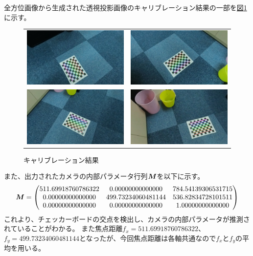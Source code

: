 \documentclass[]{jarticle}          %
\begin{document}
全方位画像から生成された透視投影画像のキャリブレーション結果の一部を\hyperref[two]{図\ref{two}}に示す。
\begin{figure}[!ht]
  \begin{center}
    \begin{tabular}{cc}
      \includegraphics[keepaspectratio, width=0.4\linewidth]{figures/GetParam_result/1.jpg}&
      \includegraphics[keepaspectratio, width=0.4\linewidth]{figures/GetParam_result/5.jpg}\\
      \includegraphics[keepaspectratio, width=0.4\linewidth]{figures/GetParam_result/9.jpg}&
      \includegraphics[keepaspectratio, width=0.4\linewidth]{figures/GetParam_result/13.jpg}\\
    \end{tabular}
  \end{center}
  \caption{キャリブレーション結果}
  \label{two}
\end{figure}
また、出力されたカメラの内部パラメータ行列$\mbox{\boldmath $M$}$を以下に示す。
\begin{equation}
  \mbox{\boldmath $M$} = 
  \begin{pmatrix}
    511.69918760786322 & 0.00000000000000 & 784.54139306531715 \\
    0.00000000000000 & 499.73234060481144 & 536.82834728101511 \\
    0.00000000000000 & 0.00000000000000 & 1.00000000000000 \\
  \end{pmatrix}
\end{equation}
これより、チェッカーボードの交点を検出し、カメラの内部パラメータが推測されていることがわかる。
また焦点距離$f_x=511.69918760786322$、$f_y=499.73234060481144$となったが、今回焦点距離は各軸共通なので$f_x$と$f_y$の平均を用いる。
\end{document}
